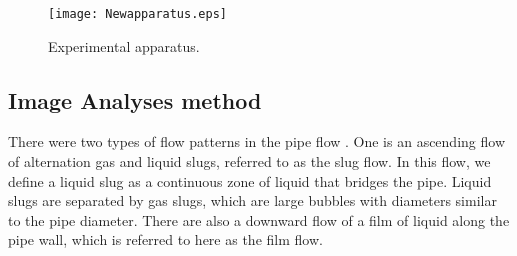 \documentclass[aps,pre,preprint,groupedaddress,showkeys]{revtex4-2}
\begin{document}
\begin{figure}
\texttt{[image: Newapparatus.eps]}%
\caption{\label{Apparatus} Experimental apparatus.}
\end{figure}

\subsection{Image Analyses method}\label{ime}
There were two types of flow patterns in the pipe flow \cite{kanno2018}. 
One is an ascending flow of alternation gas and liquid slugs, referred to as the slug flow.
In this flow, we define a liquid slug as a continuous zone of liquid that bridges the pipe. 
Liquid slugs are separated by gas slugs, which are large bubbles with diameters similar to the pipe diameter.
There are also a downward flow of a film of liquid along the pipe wall, which is referred to here as the film flow.
\end{document}
